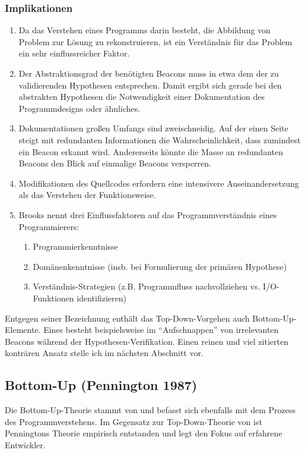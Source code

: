 \subsubsection{Implikationen}
\begin{enumerate}
\item Da das Verstehen eines Programms darin besteht, die Abbildung von Problem zur Lösung zu rekonstruieren, ist ein Verständnis für das Problem ein sehr einflussreicher Faktor.
\item Der Abstraktionsgrad der benötigten Beacons muss in etwa dem der zu validierenden Hypothesen entsprechen. Damit ergibt sich gerade bei den abstrakten Hypothesen die Notwendigkeit einer Dokumentation des Programmdesigns oder ähnliches. 
\item Dokumentationen großen Umfangs sind zweischneidig. Auf der einen Seite steigt mit redundanten Informationen die Wahrscheinlichkeit, dass zumindest ein Beacon erkannt wird. Andererseits könnte die Masse an redundanten Beacons den Blick auf einmalige Beacons versperren.
\item Modifikationen des Quellcodes erfordern eine intensivere Auseinandersetzung als das Verstehen der Funktionsweise.
\item Brooks nennt drei Einflussfaktoren auf das Programmverständnis eines Programmierers:
  \begin{enumerate}
  \item Programmierkenntnisse
  \item Domänenkenntnisse (insb. bei Formulierung der primären Hypothese)
  \item Verständnis-Strategien (z.B. Programmfluss nachvollziehen vs. I/O-Funktionen identifizieren)
  \end{enumerate}
\end{enumerate}

Entgegen seiner Bezeichnung enthält das Top-Down-Vorgehen auch Bottom-Up-Elemente. Eines besteht beispielsweise im ``Aufschnappen'' von irrelevanten Beacons während der Hypothesen-Verifikation. Einen reinen und viel zitierten konträren Ansatz stelle ich im nächsten Abschnitt vor.


\subsection{Bottom-Up (Pennington 1987)}
\label{sec:bottomup}

Die Bottom-Up-Theorie stammt von \cite{Pennington:1987dc} und befasst sich ebenfalls mit dem Prozess des Programmverstehens. Im Gegensatz zur Top-Down-Theorie von \cite{Brooks:1983fj} ist Penningtons Theorie empirisch entstanden und legt den Fokus auf erfahrene Entwickler.


